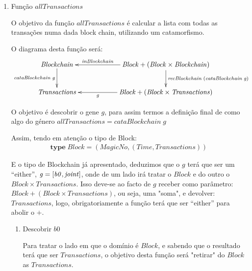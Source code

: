 \documentclass[a4paper]{article}
\newcommand{\Conid}[1]{\mathit{#1}}
\newcommand{\Varid}[1]{\mathit{#1}}
\begin{document}
\begin{enumerate}
\item Função \ensuremath{\Varid{allTransactions}}

O objetivo da função \ensuremath{\Varid{allTransactions}} é calcular a lista com todas as transações
numa dada block chain, utilizando um catamorfismo.

O diagrama desta função será:
\begin{eqnarray*}
\xymatrix@C=2cm{
    \ensuremath{\Conid{Blockchain}}
           \ar[d]_-{\ensuremath{\Varid{cataBlockchain}\;\Varid{g}}}
&
    \ensuremath{\Conid{Block}\mathbin{+}(\Conid{Block}\times\Conid{Blockchain})}
           \ar[d]^{\ensuremath{\Varid{recBlockchain}\;(\Varid{cataBlockchain}\;\Varid{g})}}
           \ar[l]_-{\ensuremath{\Varid{inBlockchain}}}
\\
     \ensuremath{\Conid{Transactions}}
&
     \ensuremath{\Conid{Block}\mathbin{+}(\Conid{Block}\times\Conid{Transactions})}
           \ar[l]^-{\ensuremath{\Varid{g}}}
}
\end{eqnarray*}


O objetivo é descobrir o gene \ensuremath{\Varid{g}}, para assim termos a definição final de como
algo do género \ensuremath{\Varid{allTransactions}\mathrel{=}\Varid{cataBlockchain}\;\Varid{g}}

Assim, tendo em atenção o tipo de Block:
\begin{eqnarray*}
\ensuremath{\mathbf{type}\;\Conid{Block}\mathrel{=}(\Conid{MagicNo},(\Conid{Time},\Conid{Transactions}))}
\end{eqnarray*}

E o tipo de Blockchain já apresentado, deduzimos que o \ensuremath{\Varid{g}} terá que ser um ``either'',
\ensuremath{\Varid{g}\mathrel{=}\alt{\Varid{b0}}{\Varid{joint}}},
onde de um lado irá tratar o \ensuremath{\Conid{Block}} e do outro o \ensuremath{\Conid{Block}\times\Conid{Transactions}}. Isso deve-se
ao facto de \ensuremath{\Varid{g}} receber como parâmetro: \ensuremath{\Conid{Block}\mathbin{+}(\Conid{Block}\times\Conid{Transactions})}, ou seja, uma
"soma", e devolver: \ensuremath{\Conid{Transactions}}, logo, obrigatoriamente a função terá que ser ``either''
para abolir o \ensuremath{\mathbin{+}}.


\begin{enumerate}
\item Descobrir \ensuremath{\Varid{b0}}

Para tratar o lado em que o domínio é \ensuremath{\Conid{Block}}, e sabendo que o resultado terá que
ser \ensuremath{\Conid{Transactions}}, o objetivo desta função será "retirar" do \ensuremath{\Conid{Block}} as \ensuremath{\Conid{Transactions}}.


\end{enumerate}
\end{enumerate}
\end{document}
